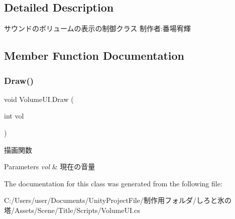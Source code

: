 \subsection{Detailed Description}
サウンドのボリュームの表示の制御クラス 制作者\+:番場宥輝 



\subsection{Member Function Documentation}
\mbox{\label{class_volume_u_i_aad38931629b297f4017f064a298d4b5e}} 
\subsubsection{\texorpdfstring{Draw()}{Draw()}}
{\footnotesize\ttfamily void Volume\+U\+I.\+Draw (\begin{DoxyParamCaption}\item[{int}]{vol }\end{DoxyParamCaption})\hspace{0.3cm}{\ttfamily [inline]}}



描画関数 


\begin{DoxyParams}{Parameters}
{\em vol} & 現在の音量\\
\hline
\end{DoxyParams}


The documentation for this class was generated from the following file\+:\begin{DoxyCompactItemize}
\item 
C\+:/\+Users/user/\+Documents/\+Unity\+Project\+File/制作用フォルダ/しろと氷の塔/\+Assets/\+Scene/\+Title/\+Scripts/Volume\+U\+I.\+cs\end{DoxyCompactItemize}
